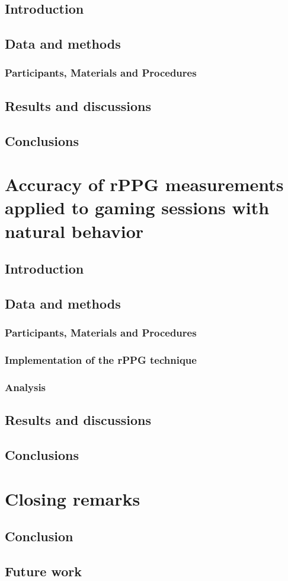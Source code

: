   \section{Introduction}
  \section{Data and methods}
    \subsection{Participants, Materials and Procedures}
  \section{Results and discussions}
  \section{Conclusions}

\chapter{Accuracy of rPPG measurements applied to gaming sessions with natural behavior}
  \section{Introduction}
  \section{Data and methods}
    \subsection{Participants, Materials and Procedures}
    \subsection{Implementation of the rPPG technique}
    \subsection{Analysis}
  \section{Results and discussions}
  \section{Conclusions}

\chapter{Closing remarks}
  \section{Conclusion}
  \section{Future work}
